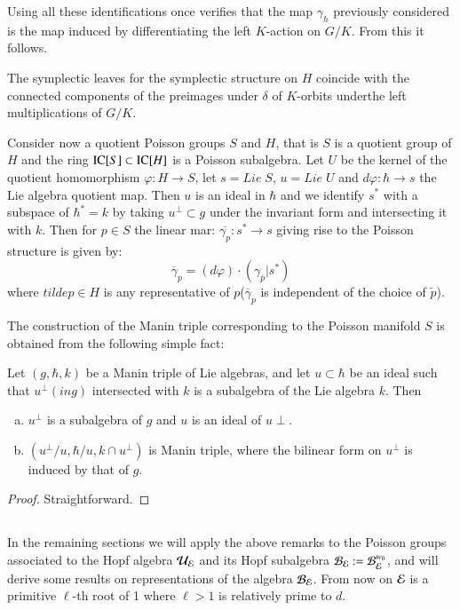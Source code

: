 Using all these identifications once verifies that the map $\gamma_{h}$ previously considered is the map induced by differentiating the left $K$-action on $G/K$. From this it follows.

\begin{prop*}
The symplectic leaves for the symplectic structure on $H$ coincide with the connected components of the preimages under $\delta$ of $K$-orbits under\pageoriginale the left multiplications of $G/K$.
\end{prop*}

Consider now a quotient Poisson groups $S$ and $H$, that is $S$ is a quotient group of $H$ and the ring $\operatorname{IC}[S] \subset \operatorname{IC}[H]$ is a Poisson subalgebra. Let $U$ be the kernel of the quotient homomorphism $\varphi: H \rightarrow S$, let $s= Lie\; S$, $u = Lie\; U$ and $d\varphi : \hbar \rightarrow s$ the Lie algebra quotient map. Then $u$ is an ideal in $\hbar$ and we identify $s^{*}$ with a subspace of $\hbar^{*} =k$ by taking $u^{\perp} \subset g$ under the invariant form and intersecting it with $k$. Then for $p\in S$ the linear mar: $\overline{\gamma_{p}}: s^{*} \rightarrow s$ giving rise to the Poisson structure is given by:
$$
\overline{\gamma}_{p} = (d\varphi) \cdot (\gamma_{\overline{p}} | s^{*})
$$
where $tilde{p} \in H$ is any representative of $p$($\overline{\gamma}_{p}$ is independent of the choice of $\tilde{p}$).

The construction of the Manin triple corresponding to the Poisson manifold $S$ is obtained from the following simple fact:

\begin{lemma*}
Let $(g, \hbar, k)$ be a Manin triple of Lie algebras, and let $u \subset \hbar$ be an ideal such that $u^{\perp}(in g)$ intersected with $k$ is a subalgebra of the Lie algebra $k$. Then
\begin{enumerate}[(a)]
\item $u^{\perp}$ is a subalgebra of $g$ and $u$ is an ideal of $u\perp$.\label{chap4-enum-l(a)}
\item $(u^{\perp}/u, \hbar/u, k\cap u^{\perp})$ is Manin triple, where the bilinear form on $u^{\perp}$ is induced by that of $g$.\label{chap4-enum-l(a)}
\end{enumerate}
\end{lemma*}

\begin{proof}
Straightforward.
\end{proof}

\subsection{}\label{chap4-subsec-4.3}
In the remaining sections we will apply the above remarks to the Poisson groups associated to the Hopf algebra $\mathcal{U}_{\mathcal{E}}$ and its Hopf subalgebra $\mathcal{B}_{\mathcal{E}}: = \mathcal{B}_{\mathcal{E}}^{w_{0}}$, and will derive some results on representations of the algebra $\mathcal{B}_{\mathcal{E}}$. From now on $\mathcal{E}$ is a primitive $\ell$-th root of 1 where $\ell > 1$ is relatively prime to $d$.

